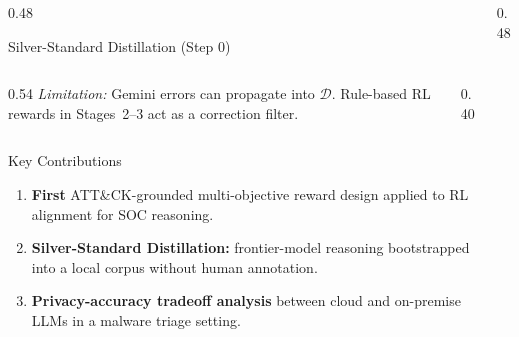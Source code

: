 \documentclass[final]{beamer}
\newcommand{\vsep}{\vspace{1.2em}}
\begin{document}
\begin{frame}[t]{}
\begin{columns}[T]
\begin{column}{0.48\linewidth}
\begin{block}{Silver-Standard Distillation (Step 0)}
\begin{columns}[T]
\begin{column}{0.54\linewidth}
    \smallskip
    \textit{Limitation:} Gemini errors can propagate into $\mathcal{D}$.
    Rule-based RL rewards in Stages~2--3 act as a correction filter.
  \end{column}
  \begin{column}{0.40\linewidth}
    \begin{center}
    \end{center}
  \end{column}
\end{columns}

\end{block}

\vsep

\begin{block}{Key Contributions}
\begin{enumerate}
  \item \textbf{First} ATT\&CK-grounded multi-objective reward design
    applied to RL alignment for SOC reasoning.
  \item \textbf{Silver-Standard Distillation:} frontier-model reasoning
    bootstrapped into a local corpus without human annotation.
  \item \textbf{Privacy-accuracy tradeoff analysis} between cloud and
    on-premise LLMs in a malware triage setting.
\end{enumerate}
\end{block}

\end{column} %

\begin{column}{0.48\linewidth}


\end{column}
\end{columns}
\end{frame}
\end{document}

